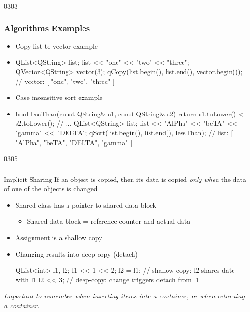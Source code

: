 \begin{slide}[fragile]{0303}\frametitle{Algorithms Examples}
\begin{itemize}
  \item Copy list to vector example
  \item[] \begin{cpp}
QList<QString> list;
list << "one" << "two" << "three";
QVector<QString> vector(3);
qCopy(list.begin(), list.end(), vector.begin());
// vector: [ "one", "two", "three" ]
  \end{cpp}      
  \item Case insensitive sort example
  \item[] \begin{cpp}
bool lessThan(const QString& s1, const QString& s2) {
    return s1.toLower() < s2.toLower();
}
// ...
QList<QString> list;
list << "AlPha" << "beTA" << "gamma" << "DELTA";
qSort(list.begin(), list.end(), lessThan);
// list: [ "AlPha", "beTA", "DELTA", "gamma" ]
\end{cpp}
  
\end{itemize}
\end{slide}

\begin{slide}[fragile]{0305}\frametitle{}
\begin{block}{Implicit Sharing}
If an object is copied, then its data is copied \textit{only when} the data of one of
the objects is changed
\end{block}
\begin{itemize}
  \item Shared class has a pointer to shared data block
  \begin{itemize}
    \item Shared data block = reference counter and actual data
 \end{itemize}  
  \item Assignment is a shallow copy
  \item Changing results into deep copy (detach)
\begin{cpp}
QList<int> l1, l2; l1 << 1 << 2;
l2 = l1; // shallow-copy: l2 shares date with l1
l2 << 3; // deep-copy: change triggers detach from l1
\end{cpp}  
\end{itemize}
\textit{Important to remember when inserting items into a container, or when returning a container.}
\end{slide}
